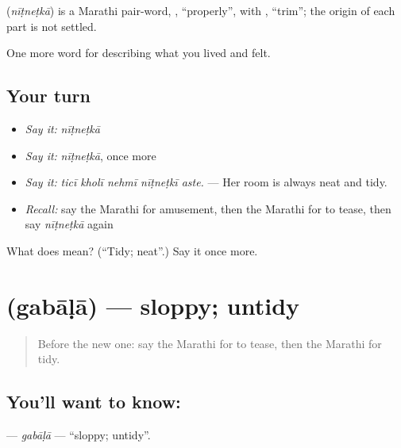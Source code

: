 \begin{cousinweb}
\textbf{} (\emph{nīṭneṭkā}) is a Marathi pair-word, , \textquotedblleft{}properly\textquotedblright{}, with , \textquotedblleft{}trim\textquotedblright{}; the origin of each part is not settled.
\end{cousinweb}

\begin{grammarlens}[title={What you've built}]
One more word for describing what you lived and felt.
\end{grammarlens}

\subsection*{Your turn}
\begin{itemize}
\raggedright
  \item \emph{Say it:} \emph{nīṭneṭkā}
  \item \emph{Say it:} \emph{nīṭneṭkā}, once more
  \item \emph{Say it:} \emph{ticī kholī nehmī nīṭneṭkī aste.} — Her room is always neat and tidy.
  \item \emph{Recall:} say the Marathi for amusement, then the Marathi for to tease, then say \emph{nīṭneṭkā} again
\end{itemize}

\begin{tcolorbox}[breakable,colback=teal!4,colframe=teal!35!black,title={Before you move on}]
What does  mean? (\textquotedblleft{}Tidy; neat\textquotedblright{}.) Say it once more.
\end{tcolorbox}
\section[\texorpdfstring{\mr{गबाळा} (gabāḷā)}{गबाळा (gabāḷā)}]{ (gabāḷā) — sloppy; untidy}

\label{lesson:MR-C474-gabala}



\begin{quote}
Before the new one: say the Marathi for to tease, then the Marathi for tidy.
\end{quote}

\subsection*{You'll want to know: }
\textbf{} — \emph{gabāḷā} — \textquotedblleft{}sloppy; untidy\textquotedblright{}.

